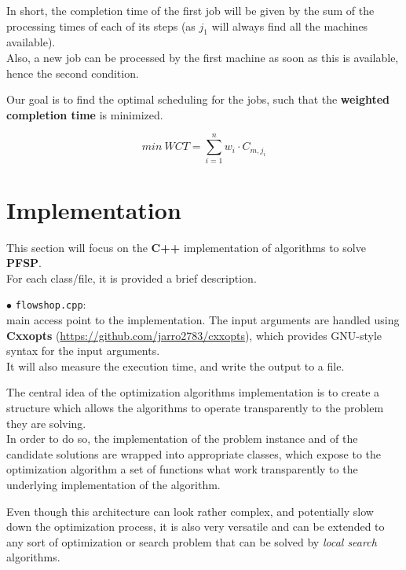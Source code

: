 \documentclass[
12pt,
a4paper,
oneside,
headinclude,
footinclude]{article}
\theoremstyle{definition} %
\begin{document}
In short, the completion time of the first job will be given by the sum of the processing times of each of its steps (as $j_1$ will always find all the machines available).\\
Also, a new job can be processed by the first machine as soon as this is available, hence the second condition.

Our goal is to find the optimal scheduling for the jobs, such that the \textbf{weighted completion time} is minimized.

$$min\ WCT = \sum_{i=1}^n{w_i \cdot C_{m, j_i}}$$






\newpage
\section{Implementation}
This section will focus on the \textbf{C++} implementation of algorithms to solve \textbf{PFSP}. \\
For each class/file, it is provided a brief description.

$\bullet$ \texttt{flowshop.cpp}:\\
main access point to the implementation. The input arguments are handled using \textbf{Cxxopts} (\href{https://github.com/jarro2783/cxxopts}{https://github.com/jarro2783/cxxopts}), which provides GNU-style syntax for the input arguments.\\
It will also measure the execution time, and write the output to a file.

The central idea of the optimization algorithms implementation is to create a structure which allows the algorithms to operate transparently to the problem they are solving.\\
In order to do so, the implementation of the problem instance and of the candidate solutions are wrapped into appropriate classes, which expose to the optimization algorithm a set of functions what work transparently to the underlying implementation of the algorithm.

Even though this architecture can look rather complex, and potentially slow down the optimization process, it is also very versatile and can be extended to any sort of optimization or search problem that can be solved by \textit{local search}
algorithms.
\end{document}
